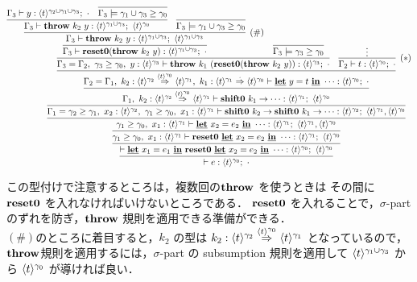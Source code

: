 \def\proofone{
  \infer
  {\vdash e:\tzero;~\cdot{}}
  {
    \infer{\vdash \cLet~x_1=e_1~\cIn~\Resetz~\cLet~x_2=e_2~\cIn~\cdots :
      \tzero;~\tzero
    }
    {\infer{\longer{\gamma_1}{\gamma_0},~x_1:\tone \vdash
        \Resetz~\cLet~x_2=e_2~\cIn~\cdots : \tone;~\tzero
      }
      {\prooftwo}
    }
  }
}
\def\prooftwo{
  \infer{\longer{\gamma_1}{\gamma_0},~x_1:\tone \vdash
    \cLet~x_2=e_2~\cIn~\cdots : \tone;~\tone,\tzero}
  {\infer{\Gamma_1=\longer{\gamma_2}{\gamma_1},~x_2:\ttwo,~\longer{\gamma_1}{\gamma_0},~x_1:\tone \vdash
      \shiftz{k_2}{\shiftz{k_1}{\cdots}} : \ttwo;~\tone,\tzero
    }
    {\proofthree}
  }
}

\def\proofthree{
  \infer{\Gamma_1,~k_2:\contT{\ttwo}{\tone}{\tzero}
    \vdash \shiftz{k_1}{\cdots} : \tone;~ \tzero
  }
  {\infer{\Gamma_2=\Gamma_1,~k_2:\contT{\ttwo}{\tone}{\tzero},
      ~k_1:\contT{\tone}{\tzero}{\cdot{}}
      \vdash \cLet~ y=t~ \cIn~\cdots : \tzero;~\cdot{}
    }
    {\prooffour}
  }
}

\def\prooffour{
  \infer{\Gamma_3=\Gamma_2,~\longer{\gamma_3}{\gamma_0},~y:\tthree \vdash \throw{k_1}{(\Resetz(\throw{k_2}{y}))} : \tthree;~\cdot{}}
  {\prooffive}
  & \infer[(*)]{\Gamma_2 \vdash t : \tzero;~ \cdot}{\vdots}
}

\def\prooffive{
  \infer
  {\Gamma_3 \vdash \Resetz(\throw{k_2}{y}) : \tonethree; ~\cdot{}}
  {\infer[(\#)]
    {\Gamma_3 \vdash \throw{k_2}{y} : \tonethree;~\tonethree}
    {\infer
      {\Gamma_3 \vdash \throw{k_2}{y} : \tonethree;~\tzero}
      {\Gamma_3 \vdash y :
        \codeT{t}{\gamma_2\uni\gamma_1\uni\gamma_3};~\cdot
        & \infer{\Gamma_3 \models
          \longer{\gamma_1\uni\gamma_3}{\gamma_0}}{}
      }
      & \infer{\Gamma_3 \models \longer{\gamma_1\uni\gamma_3}{\gamma_0}}{}
    }
  }
  & \infer{\Gamma_3 \models \longer{\gamma_3}{\gamma_0}}{}
}

\[
  \proofone
\]

この型付けで注意するところは，複数回の$\textbf{throw}$ を使うときは その間に $\textbf{reset0}$ を入れなければいけないところである．
$\textbf{reset0}$ を入れることで，$\sigma$-part のずれを防ぎ，$\textbf{throw}$ 規則を適用できる準備ができる．\\
$(\#)$のところに着目すると，$k_2$ の型は $k_2:{\langle{t}\rangle^{\gamma_2}} \stackrel{\langle{t}\rangle^{\gamma_0}}{\Rightarrow} {\langle{t}\rangle^{\gamma_1}}$ となっているので，$\textbf{throw}$規則を適用するには，$\sigma$-part の subsumption 規則を適用して $\langle{t}\rangle^{\gamma_1\cup\gamma_3}$ から $\langle{t}\rangle^{\gamma_0}$ が導ければ良い．

